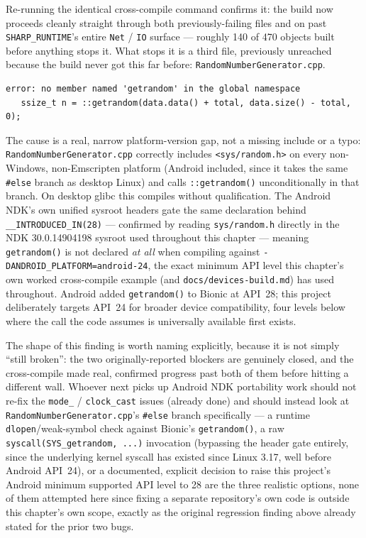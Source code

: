 Re-running the identical cross-compile command confirms it: the build now proceeds cleanly
straight through both previously-failing files and on past \texttt{SHARP\_RUNTIME}'s entire
\texttt{Net} / \texttt{IO} surface --- roughly 140 of 470 objects built before anything stops it.
What stops it is a third file, previously unreached because the build never got this far
before: \texttt{RandomNumberGenerator.cpp}.

\begin{lstlisting}
error: no member named 'getrandom' in the global namespace
   ssize_t n = ::getrandom(data.data() + total, data.size() - total, 0);
\end{lstlisting}

The cause is a real, narrow platform-version gap, not a missing include or a typo:
\texttt{RandomNumberGenerator.cpp} correctly includes \texttt{<sys/random.h>} on every
non-Windows, non-Emscripten platform (Android included, since it takes the same \texttt{\#else}
branch as desktop Linux) and calls \texttt{::getrandom()} unconditionally in that branch. On
desktop glibc this compiles without qualification. The Android NDK's own unified sysroot
headers gate the same declaration behind
\texttt{\_\_INTRODUCED\_IN(28)} --- confirmed by reading
\texttt{sys/random.h} directly in the NDK 30.0.14904198 sysroot used throughout this chapter
--- meaning \texttt{getrandom()} is not declared \emph{at all} when compiling against
\texttt{-DANDROID\_PLATFORM=android-24}, the exact minimum API level this chapter's own worked
cross-compile example (and \texttt{docs/devices-build.md}) has used throughout. Android added
\texttt{getrandom()} to Bionic at API~28; this project deliberately targets API~24 for broader
device compatibility, four levels below where the call the code assumes is universally
available first exists.

The shape of this finding is worth naming explicitly, because it is not simply ``still
broken'': the two originally-reported blockers are genuinely closed, and the cross-compile
made real, confirmed progress past both of them before hitting a different wall. Whoever next
picks up Android NDK portability work should not re-fix the \texttt{mode\_} / \texttt{clock\_cast}
issues (already done) and should instead look at \texttt{RandomNumberGenerator.cpp}'s
\texttt{\#else} branch specifically --- a runtime \texttt{dlopen}/weak-symbol check against
Bionic's \texttt{getrandom()}, a raw \texttt{syscall(SYS\_getrandom, ...)} invocation (bypassing
the header gate entirely, since the underlying kernel syscall has existed since Linux 3.17,
well before Android API~24), or a documented, explicit decision to raise this project's Android
minimum supported API level to 28 are the three realistic options, none of them attempted here
since fixing a separate repository's own code is outside this chapter's own scope, exactly as
the original regression finding above already stated for the prior two bugs.

